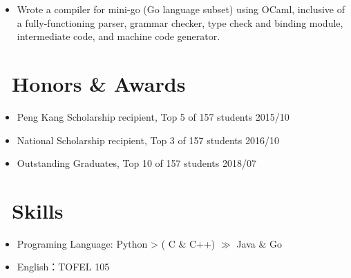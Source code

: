 \documentclass{resume}
\begin{document}
\begin{itemize} 
  \item Wrote a compiler for mini-go (Go language subset) using OCaml, inclusive of a fully-functioning parser, grammar checker, type check and binding module, intermediate code, and machine code generator.
\end{itemize}
\section{\faHeartO\ Honors \& Awards}
\begin{itemize}
    \item Peng Kang Scholarship recipient, Top 5 of 157 students \hfill 2015/10
  \item National Scholarship recipient, Top 3 of 157 students \hfill 2016/10
    \item Outstanding Graduates, Top 10 of 157 students \hfill 2018/07
\end{itemize}
\section{\faCogs\ Skills}
\begin{itemize}[parsep=0.5ex]
  \item Programing Language: Python > ( C \& C++) $\gg$ Java \& Go
  \item English：TOFEL 105
\end{itemize}
\end{document}
